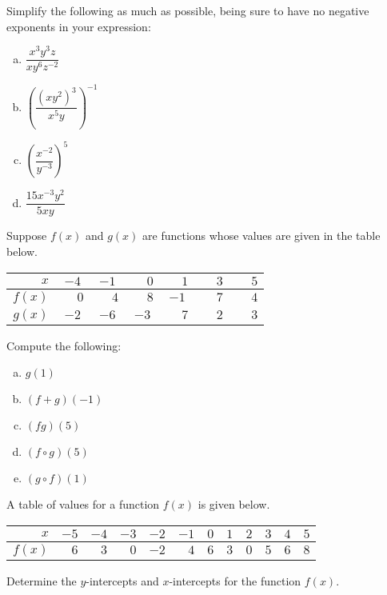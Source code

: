 \documentclass[11pt,letterpaper]{article}
\begin{document}
\prob Simplify the following as much as possible, being sure to have no negative exponents in your expression: \pspace
\begin{enumerate}[(a)] 
\item $\dfrac{x^3 y^3 z}{x y^6 z^{-2}}$ 
\item $\left( \dfrac{(xy^2)^3}{x^5y} \right)^{-1}$ 
\item $\left( \dfrac{x^{-2}}{y^{-3}} \right)^{5}$ 
\item $\dfrac{15 x^{-3} y^2}{5xy}$ 
\end{enumerate} \pspace


\prob Suppose $f(x)$ and $g(x)$ are functions whose values are given in the table below.
	\begin{table}[H]
	\centering
	\begin{tabular}{|r||c|c|c|c|c|c|} \hline
	$x$ & $-4$ & $-1$ & $\phantom{-}0$ & $\phantom{-}1$ & $\phantom{-}3$ & $\phantom{-}5$ \\ \hline
	$f(x)$ & $\phantom{-}0$ & $\phantom{-}4$ & $\phantom{-}8$ & $-1$ & $\phantom{-}7$ & $\phantom{-}4$ \\ \hline
	$g(x)$ & $-2$ & $-6$ & $-3$ & $\phantom{-}7$ & $\phantom{-}2$ & $\phantom{-}3$ \\ \hline
	\end{tabular}
	\end{table} \par
Compute the following: \pspace
        \begin{enumerate}[(a)]
        \item $g(1)$ 
        \item $(f + g)(-1)$ 
        \item $(fg)(5)$ 
        \item $(f \circ g)(5)$ 
        \item $(g \circ f)(1)$ 
        \end{enumerate} \pspace


\prob A table of values for a function $f(x)$ is given below.
	\begin{table}[H]
	\centering
	\begin{tabular}{r||rrrrrrrrrrr}
	$x$ & $-5$ & $-4$ & $-3$ & $-2$ & $-1$ & $0$ & $1$ & $2$ & $3$ & $4$ & $5$ \\ \hline
	$f(x)$ & $6$ & $3$ & $0$ & $-2$ & $4$ & $6$ & $3$ & $0$ & $5$ & $6$ & $8$
	\end{tabular}
	\end{table} \par
Determine the $y$-intercepts and $x$-intercepts for the function $f(x)$. \pspace
\end{document}
